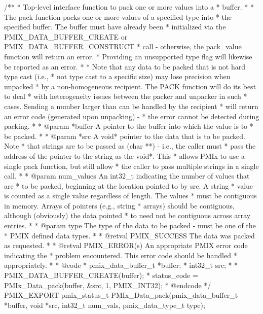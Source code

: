 \cspecificstart
\begin{codepar}
/**
 * Top-level interface function to pack one or more values into a
 * buffer.
 *
 * The pack function packs one or more values of a specified type into
 * the specified buffer.  The buffer must have already been
 * initialized via the PMIX_DATA_BUFFER_CREATE or PMIX_DATA_BUFFER_CONSTRUCT
 * call - otherwise, the pack_value function will return an error.
 * Providing an unsupported type flag will likewise be reported as an error.
 *
 * Note that any data to be packed that is not hard type cast (i.e.,
 * not type cast to a specific size) may lose precision when unpacked
 * by a non-homogeneous recipient.  The PACK function will do its best to deal
 * with heterogeneity issues between the packer and unpacker in such
 * cases. Sending a number larger than can be handled by the recipient
 * will return an error code (generated upon unpacking) -
 * the error cannot be detected during packing.
 *
 * @param *buffer A pointer to the buffer into which the value is to
 * be packed.
 *
 * @param *src A void* pointer to the data that is to be packed. Note
 * that strings are to be passed as (char **) - i.e., the caller must
 * pass the address of the pointer to the string as the void*. This
 * allows PMIx to use a single pack function, but still allow
 * the caller to pass multiple strings in a single call.
 *
 * @param num_values An int32_t indicating the number of values that are
 * to be packed, beginning at the location pointed to by src. A string
 * value is counted as a single value regardless of length. The values
 * must be contiguous in memory. Arrays of pointers (e.g., string
 * arrays) should be contiguous, although (obviously) the data pointed
 * to need not be contiguous across array entries.
 *
 * @param type The type of the data to be packed - must be one of the
 * PMIX defined data types.
 *
 * @retval PMIX_SUCCESS The data was packed as requested.
 *
 * @retval PMIX_ERROR(s) An appropriate PMIX error code indicating the
 * problem encountered. This error code should be handled
 * appropriately.
 *
 * @code
 * pmix_data_buffer_t *buffer;
 * int32_t src;
 *
 * PMIX_DATA_BUFFER_CREATE(buffer);
 * status_code = PMIx_Data_pack(buffer, &src, 1, PMIX_INT32);
 * @endcode
 */
PMIX_EXPORT pmix_status_t PMIx_Data_pack(pmix_data_buffer_t *buffer,
                                         void *src, int32_t num_vals,
                                         pmix_data_type_t type);
\end{codepar}
\cspecificend


